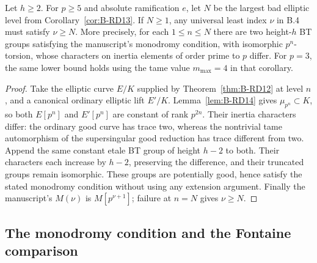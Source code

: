 \begin{proposition}
\label{prop:B-RD16}
Let $h\geq2$. For $p\geq5$ and absolute ramification $e$, let $N$
be the largest bad elliptic level from Corollary~\ref{cor:B-RD13}.
If $N\geq1$, any universal least index $\nu$ in B.4 must satisfy
$\nu\geq N$. More precisely, for each $1\leq n\leq N$ there are two
height-$h$ BT groups satisfying the manuscript's monodromy condition,
with isomorphic $p^n$-torsion, whose characters on inertia elements of
order prime to $p$ differ. For $p=3$, the same lower bound holds using
the tame value $m_{\max}=4$ in that corollary.
\end{proposition}
\begin{proof}
Take the elliptic curve $E/K$ supplied by Theorem~\ref{thm:B-RD12}
at level $n$, and a canonical ordinary elliptic lift $E'/K$.
Lemma~\ref{lem:B-RD14} gives $\mu_{p^n}\subset K$, so both
$E[p^n]$ and $E'[p^n]$ are constant of rank $p^{2n}$.
Their inertia characters differ: the ordinary good curve has trace
two, whereas the nontrivial tame automorphism of the supersingular
good reduction has trace different from two. Append the same constant
etale BT group of height $h-2$ to both. Their characters each increase
by $h-2$, preserving the difference, and their truncated groups remain
isomorphic. These groups are potentially good, hence satisfy the
stated monodromy condition without using any extension argument.
Finally the manuscript's $M(\nu)$ is $M[p^{\nu+1}]$; failure at
$n=N$ gives $\nu\geq N$.
\end{proof}

\subsection{The monodromy condition and the Fontaine comparison}

